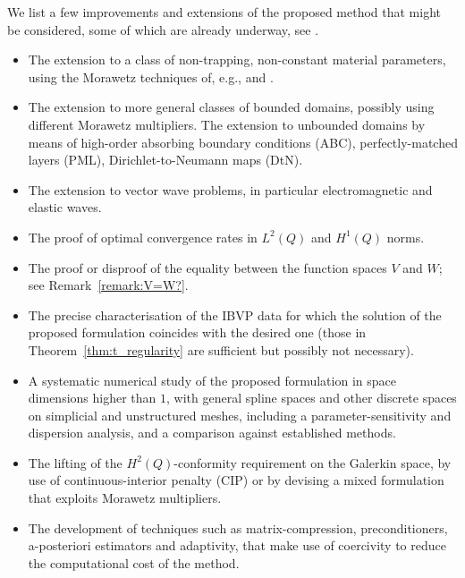 \documentclass[a4paper]{article}
\theoremstyle{plain}
\theoremstyle{definition}
\begin{document}
We list a few improvements and extensions of the proposed method that might be considered, some of which are already underway, see \cite{Bignardi2025}.
\begin{itemize}
	\item The extension to a class of non-trapping, non-constant material parameters, using the Morawetz techniques of, e.g., \cite{Moiola2019} and \cite{Graham2019}.

\item The extension to more general classes of bounded domains, possibly using different Morawetz multipliers.
The extension to unbounded domains by means of high-order absorbing boundary conditions (ABC), perfectly-matched layers (PML), Dirichlet-to-Neumann maps (DtN).

\item The extension to vector wave problems, in particular electromagnetic and elastic waves.

\item The proof of optimal convergence rates in $L^2(Q)$ and $H^1(Q)$ norms.

\item The proof or disproof of the equality between the function spaces $V$ and $W$; see Remark~\ref{remark:V=W?}.
\item The precise characterisation of the IBVP data for which the solution of the proposed formulation coincides with the desired one (those in Theorem~\ref{thm:t_regularity} are sufficient but possibly not necessary).

\item A systematic numerical study of the proposed formulation in space dimensions higher than $1$, with general spline spaces and other discrete spaces on simplicial and unstructured meshes, including a parameter-sensitivity and dispersion analysis, and a comparison against established methods.

\item The lifting of the $H^2(Q)$-conformity requirement on the Galerkin space, by use of continuous-interior penalty (CIP) or by devising a mixed formulation that exploits Morawetz multipliers.

\item The development of techniques such as matrix-compression, preconditioners, a-posteriori estimators and adaptivity, that make use of coercivity to reduce the computational cost of the method.
\end{itemize}
\end{document}
